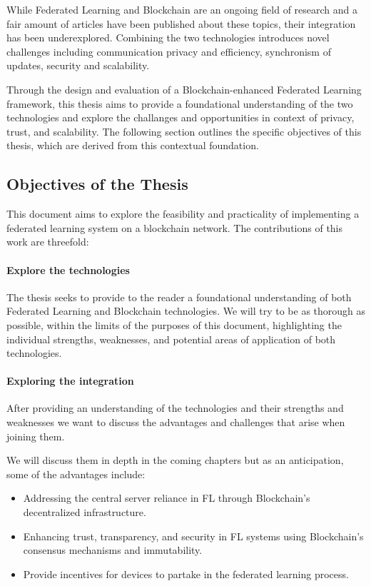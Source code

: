 While Federated Learning and Blockchain are an ongoing field of research and a fair amount of articles have
been published about these topics,
their integration has been underexplored. Combining the two technologies introduces novel challenges
including communication privacy and efficiency, synchronism of updates, security and scalability.

Through the design and evaluation of a Blockchain-enhanced Federated Learning framework, this thesis aims to
provide a foundational understanding of the two technologies and explore the challanges and opportunities in
context of privacy, trust, and scalability. The following section outlines the specific objectives of this
thesis, which are derived from this contextual foundation.

\subsection{Objectives of the Thesis}

This document aims to explore the feasibility and practicality of implementing a federated learning system on
a blockchain network. The contributions of this work are threefold:

\paragraph{Explore the technologies}
The thesis seeks to provide to the reader a foundational understanding of both Federated Learning and Blockchain
technologies. We will try to be as thorough as possible, within the limits of the purposes of this document,
highlighting the individual strengths, weaknesses, and potential areas of
application of both technologies.

\paragraph{Exploring the integration}
After providing an understanding of the technologies and their strengths and weaknesses we want to discuss
the advantages and challenges that arise when joining them.

We will discuss them in depth in the coming chapters but as an anticipation, some of the advantages include:
\begin{itemize}
  \item Addressing the central server reliance in FL through Blockchain's decentralized
    infrastructure.
  \item Enhancing trust, transparency, and security in FL systems using Blockchain's
    consensus mechanisms and immutability.
  \item Provide incentives for devices to partake in the federated learning process.
\end{itemize}

